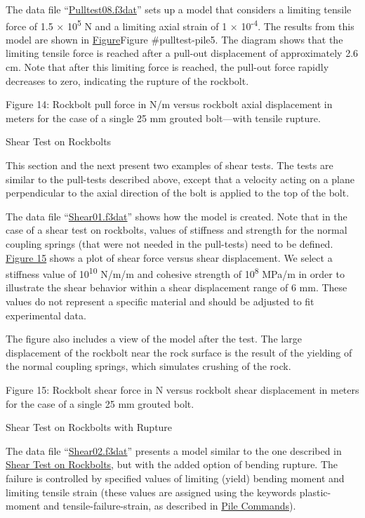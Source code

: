 \documentclass[a4paper, nobind]{templates/ociamthesis}
\begin{document}
The data file ``\protect\hyperlink{pulltest08data}{Pulltest08.f3dat}'' sets up a model that
considers a limiting tensile force of 1.5 × 10\textsuperscript{5} N and a limiting
axial strain of 1 × 10\textsuperscript{-4}. The results from this model are shown in
\href{.html\#pulltest-pile5}{Figure}Figure \#pulltest-pile5. The diagram
shows that the limiting
tensile force is reached after a pull-out displacement of approximately
2.6 cm.
Note that after this limiting force is reached, the pull-out force
rapidly
decreases to zero, indicating the rupture of the rockbolt.

Figure 14: Rockbolt pull force in N/m versus rockbolt axial
displacement in meters for the case of a single 25 mm grouted
bolt---with tensile
rupture.

Shear Test on Rockbolts

This section and the next present two examples of shear tests. The tests
are
similar to the pull-tests described above, except that a velocity acting
on a
plane perpendicular to the axial direction of the bolt is applied to the
top of
the bolt.

The data file ``\protect\hyperlink{pulltestshear01data}{Shear01.f3dat}'' shows how the
model
is created. Note that in the case of a shear test on rockbolts, values
of
stiffness and strength for the normal coupling springs (that were not
needed in
the pull-tests) need to be defined. \protect\hyperlink{pulltest-shear1}{Figure 15}
shows a plot of shear force versus shear displacement. We select a
stiffness
value of 10\textsuperscript{10} N/m/m and cohesive strength of 10\textsuperscript{8} MPa/m in
order to illustrate the shear behavior within a shear displacement range
of 6
mm. These values do not represent a specific material and should be
adjusted to
fit experimental data.

The figure also includes a view of the model after the test. The large
displacement of the rockbolt near the rock surface is the result of the
yielding
of the normal coupling springs, which simulates crushing of the rock.

Figure 15: Rockbolt shear force in N versus rockbolt shear
displacement in meters for the case of a single 25 mm grouted bolt.

Shear Test on Rockbolts
with Rupture

The data file ``\protect\hyperlink{pulltestshear02data}{Shear02.f3dat}'' presents a model
similar to the one described in \protect\hyperlink{pulltest-shear-bolt-section}{Shear Test on
Rockbolts},
but with the added option of bending rupture. The failure is controlled
by
specified values of limiting (yield) bending moment and limiting tensile
strain
(these values are assigned using the keywords plastic-moment and
tensile-failure-strain, as described in \href{../../../../sel/doc/manual/sel_manual/piles/commands/pile_commands.html\#sel-pile-commands}{Pile
Commands}).
\end{document}
